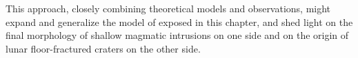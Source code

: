 This approach, closely combining  theoretical models and observations,
might  expand  and  generalize  the  model  of  \citet{Michaut:2011kg}
exposed in  this chapter, and  shed light  on the final  morphology of
shallow magmatic  intrusions on one  side and  on the origin  of lunar
floor-fractured craters on the other side.



